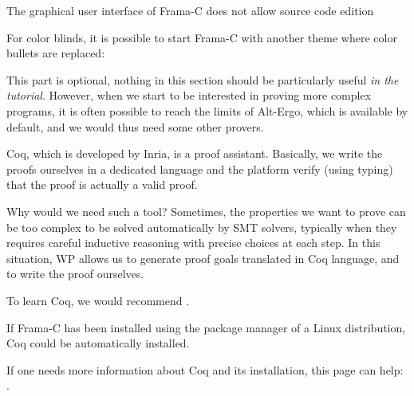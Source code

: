 



\begin{Warning}
  The graphical user interface of Frama-C does not allow source code edition
\end{Warning}


\begin{Information}
  For color blinds, it is possible to start Frama-C with another theme where
  color bullets are replaced:
  
\end{Information}




This part is optional, nothing in this section should be particularly
useful \emph{in the tutorial}. However, when we start to be interested
in proving more complex programs, it is often possible to reach the
limits of Alt-Ergo, which is available by default, and we would thus need
some other provers.





Coq, which is developed by Inria, is a proof assistant. Basically, we
write the proofs ourselves in a dedicated language and the platform
verify (using typing) that the proof is actually a valid proof.



Why would we need such a tool? Sometimes, the properties we want to
prove can be too complex to be solved automatically by SMT solvers,
typically when they requires careful inductive reasoning with precise
choices at each step. In this situation, WP allows us to generate proof
goals translated in Coq language, and to write the proof ourselves.




To learn Coq, we would recommend
.



\begin{Information}
  If Frama-C has been installed using the package manager of a Linux
  distribution, Coq could be automatically installed.
\end{Information}


If one needs more information about Coq and its installation, this page
can help: .



